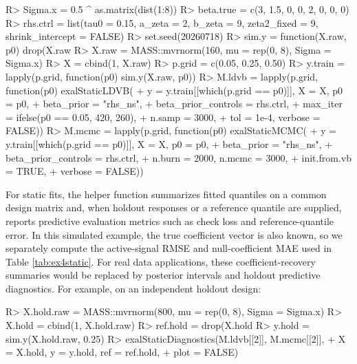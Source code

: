\documentclass[jss]{jss}
\begin{document}
\begin{CodeChunk}
\begin{CodeInput}
R> Sigma.x = 0.5 ^ as.matrix(dist(1:8))
R> beta.true = c(3, 1.5, 0, 0, 2, 0, 0, 0)
R> rhs.ctrl = list(tau0 = 0.15, a_zeta = 2, b_zeta = 9,
                   zeta2_fixed = 9, shrink_intercept = FALSE)
R> set.seed(20260718)
R> sim.y = function(X.raw, p0) {
      drop(X.raw %
    }
R> X.raw = MASS::mvrnorm(160, mu = rep(0, 8), Sigma = Sigma.x)
R> X = cbind(1, X.raw)
R> p.grid = c(0.05, 0.25, 0.50)
R> y.train = lapply(p.grid, function(p0) sim.y(X.raw, p0))
R> M.ldvb = lapply(p.grid, function(p0) exalStaticLDVB(
+                    y = y.train[[which(p.grid == p0)]], X = X, p0 = p0,
+                    beta_prior = "rhs_ns",
+                    beta_prior_controls = rhs.ctrl,
+                    max_iter = ifelse(p0 == 0.05, 420, 260),
+                    n.samp = 3000,
+                    tol = 1e-4, verbose = FALSE))
R> M.mcmc = lapply(p.grid, function(p0) exalStaticMCMC(
+                    y = y.train[[which(p.grid == p0)]], X = X, p0 = p0,
+                    beta_prior = "rhs_ns",
+                    beta_prior_controls = rhs.ctrl,
+                    n.burn = 2000, n.mcmc = 3000,
+                    init.from.vb = TRUE,
+                    verbose = FALSE))
\end{CodeInput}
\end{CodeChunk}

For static fits, the helper function  summarizes fitted quantiles on a common design matrix and, when holdout responses or a reference quantile are supplied, reports predictive evaluation metrics such as check loss and reference-quantile error. In this simulated example, the true coefficient vector is also known, so we separately compute the active-signal RMSE and null-coefficient MAE used in Table \ref{tab:ex4static}. For real data applications, these coefficient-recovery summaries would be replaced by posterior intervals and holdout predictive diagnostics. For example, on an independent holdout design:

\begin{CodeChunk}
\begin{CodeInput}
R> X.hold.raw = MASS::mvrnorm(800, mu = rep(0, 8), Sigma = Sigma.x)
R> X.hold = cbind(1, X.hold.raw)
R> ref.hold = drop(X.hold %
R> y.hold = sim.y(X.hold.raw, 0.25)
R> exalStaticDiagnostics(M.ldvb[[2]], M.mcmc[[2]],
+                  X = X.hold, y = y.hold, ref = ref.hold,
+                  plot = FALSE)
\end{CodeInput}
\end{CodeChunk}
\end{document}
